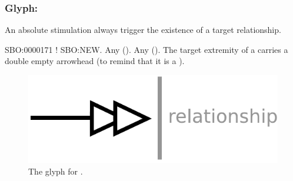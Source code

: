 \color{red}

\subsubsection{Glyph: }\label{sec:absoluteStimulation}

An absolute stimulation always trigger the existence of a target relationship. 

\begin{glyphDescription}
 \glyphSboTerm SBO:0000171 ! SBO:NEW.
 \glyphOrigin Any  ().
 \glyphTarget Any  ().
 \glyphEndPoint The target extremity of a  carries a double empty arrowhead (to remind that it is a ).
 \end{glyphDescription}

\begin{figure}[H]
  \centering
  \includegraphics[scale = 0.5]{images/absoluteStimulation}
  \caption{The \PD glyph for .}
  \label{fig:absoluteStimulation}
\end{figure}


\normalcolor